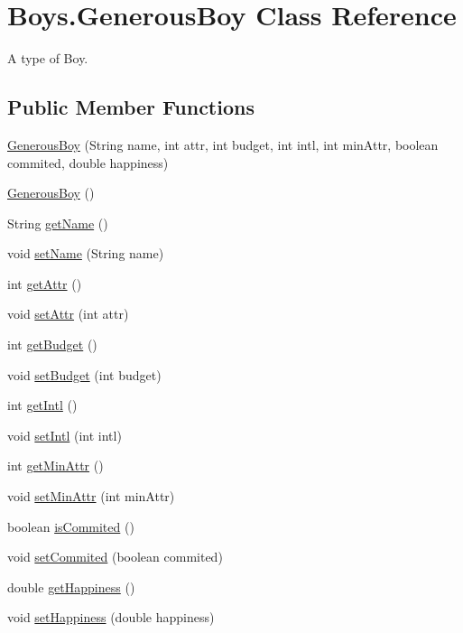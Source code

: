 \hypertarget{class_boys_1_1_generous_boy}{}\section{Boys.\+Generous\+Boy Class Reference}
\label{class_boys_1_1_generous_boy}


A type of Boy.  


\subsection*{Public Member Functions}
\begin{DoxyCompactItemize}
\item 
\hyperlink{class_boys_1_1_generous_boy_ab80b3dd04f4b48fbe1993e9790ecffec}{Generous\+Boy} (String name, int attr, int budget, int intl, int min\+Attr, boolean commited, double happiness)
\item 
\hyperlink{class_boys_1_1_generous_boy_a2af1dc8d53261756f2dac1930c83bdeb}{Generous\+Boy} ()
\item 
String \hyperlink{class_boys_1_1_generous_boy_a8771ae1537a1068542a41c41ff88620d}{get\+Name} ()
\item 
void \hyperlink{class_boys_1_1_generous_boy_a342605006bf8be1f553c53aeaf6f2537}{set\+Name} (String name)
\item 
int \hyperlink{class_boys_1_1_generous_boy_a2a49cbbaddb3bbc1144c053eea37178e}{get\+Attr} ()
\item 
void \hyperlink{class_boys_1_1_generous_boy_a51770dbffeb845400c5561d8e0f5ac85}{set\+Attr} (int attr)
\item 
int \hyperlink{class_boys_1_1_generous_boy_ad67b76eacea6c4575356f101b96ab335}{get\+Budget} ()
\item 
void \hyperlink{class_boys_1_1_generous_boy_a6217eea9f6024660f7f42b04e348ebda}{set\+Budget} (int budget)
\item 
int \hyperlink{class_boys_1_1_generous_boy_a82af44cebd74c21f311192b2f26f01d9}{get\+Intl} ()
\item 
void \hyperlink{class_boys_1_1_generous_boy_a744fa0a1db4b6c16586d27b4a9457157}{set\+Intl} (int intl)
\item 
int \hyperlink{class_boys_1_1_generous_boy_a8a2fe125cc7e9ff74f19e37e7a27875a}{get\+Min\+Attr} ()
\item 
void \hyperlink{class_boys_1_1_generous_boy_a45958ef24ac3f12420dd0c9ff6dc1999}{set\+Min\+Attr} (int min\+Attr)
\item 
boolean \hyperlink{class_boys_1_1_generous_boy_a11fc6528df408da8d197595bbb3ff7d9}{is\+Commited} ()
\item 
void \hyperlink{class_boys_1_1_generous_boy_abe573845aaf2313baa1eba587ba65877}{set\+Commited} (boolean commited)
\item 
double \hyperlink{class_boys_1_1_generous_boy_aafda668acd8d09b542b4130e22f3f1c6}{get\+Happiness} ()
\item 
void \hyperlink{class_boys_1_1_generous_boy_a6596e9b9eb1423dfb62ffd3266323ee0}{set\+Happiness} (double happiness)
\end{DoxyCompactItemize}
